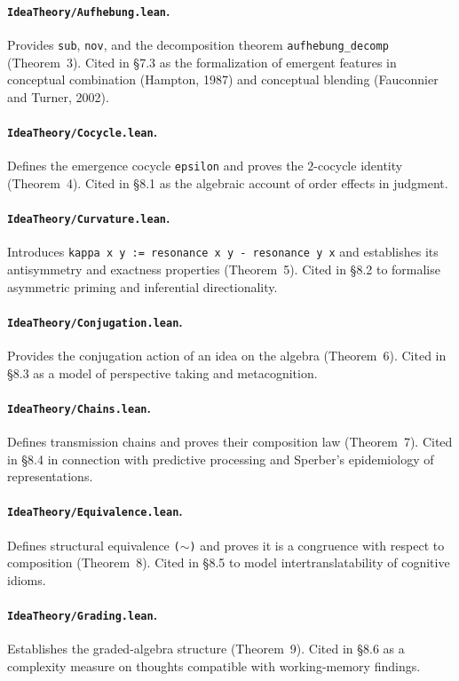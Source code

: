 \documentclass[11pt,oneside]{book}
\begin{document}
\paragraph{\texttt{IdeaTheory/Aufhebung.lean}.}
Provides \texttt{sub}, \texttt{nov}, and the decomposition theorem
\texttt{aufhebung\_decomp} (Theorem~3).  Cited in \S 7.3 as the
formalization of emergent features in conceptual combination
(Hampton, 1987) and conceptual blending (Fauconnier and Turner,
2002).

\paragraph{\texttt{IdeaTheory/Cocycle.lean}.}
Defines the emergence cocycle \texttt{epsilon} and proves the
$2$-cocycle identity (Theorem~4).  Cited in \S 8.1 as the algebraic
account of order effects in judgment.

\paragraph{\texttt{IdeaTheory/Curvature.lean}.}
Introduces \texttt{kappa x y := resonance x y - resonance y x} and
establishes its antisymmetry and exactness properties (Theorem~5).
Cited in \S 8.2 to formalise asymmetric priming and inferential
directionality.

\paragraph{\texttt{IdeaTheory/Conjugation.lean}.}
Provides the conjugation action of an idea on the algebra
(Theorem~6).  Cited in \S 8.3 as a model of perspective taking and
metacognition.

\paragraph{\texttt{IdeaTheory/Chains.lean}.}
Defines transmission chains and proves their composition law
(Theorem~7).  Cited in \S 8.4 in connection with predictive
processing and Sperber's epidemiology of representations.

\paragraph{\texttt{IdeaTheory/Equivalence.lean}.}
Defines structural equivalence \texttt{(\(\sim\))} and proves it is
a congruence with respect to composition (Theorem~8).  Cited in
\S 8.5 to model intertranslatability of cognitive idioms.

\paragraph{\texttt{IdeaTheory/Grading.lean}.}
Establishes the graded-algebra structure (Theorem~9).  Cited in
\S 8.6 as a complexity measure on thoughts compatible with
working-memory findings.



\end{document}
